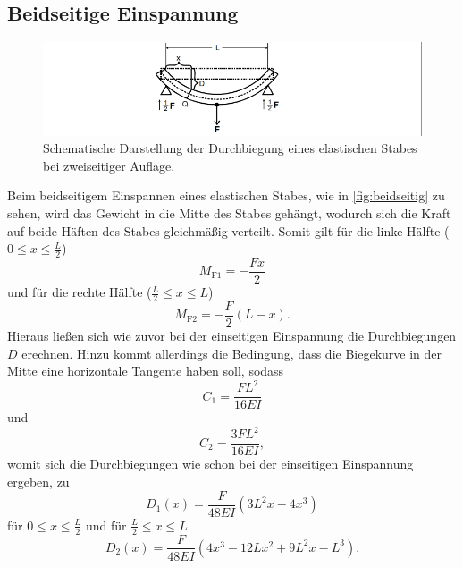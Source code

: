     \subsection{Beidseitige Einspannung}

        \begin{figure}
            \centering
            \includegraphics{content/beidseitig.png}
            \caption{Schematische Darstellung der Durchbiegung eines elastischen Stabes bei zweiseitiger Auflage. \cite{V103-s110}}
            \label{fig:beidseitig}
        \end{figure}

        Beim beidseitigem Einspannen eines elastischen Stabes, wie in \autoref{fig:beidseitig} zu sehen, wird das Gewicht in die Mitte des Stabes gehängt,
        wodurch sich die Kraft auf beide Häften des Stabes gleichmäßig verteilt.
        Somit gilt für die linke Hälfte ($0 \leq x \leq \frac{L}{2}$)
        \begin{equation}
        \label{eqn:mf1}
            M_\text{F1} = - \frac{F x } {2}
        \end{equation}
        und für die rechte Hälfte ($\frac{L}{2} \leq x \leq L $)    
        \begin{equation}
        \label{eqn:mf2}
            M_\text{F2} = - \frac {F}{2} (L - x).
        \end{equation}    
        Hieraus ließen sich wie zuvor bei der einseitigen Einspannung die Durchbiegungen $D$ erechnen.
        Hinzu kommt allerdings die Bedingung, dass die Biegekurve in der Mitte eine horizontale Tangente haben soll, sodass
        \begin{equation}
        \label{eqn:c1}
            C_1 = \frac{ F L^2} {16 E I}
        \end{equation}
        und 
        \begin{equation}
        \label{eqn:c2}
            C_2 = \frac{3 F L^2}{16 E I},
        \end{equation}
        womit sich die Durchbiegungen wie schon bei der einseitigen Einspannung ergeben, zu
        \begin{equation}
        \label{eqn:Durchbiegungbeidseitig1}
             D_1(x) =  \frac{F} {48 E I} (3L^2 x - 4 x^3)  
        \end{equation}
        für $0 \leq x \leq \frac{L}{2}$
        und für $\frac{L}{2} \leq x \leq L$
        \begin{equation}
        \label{eqn:Durchbiegungbeidseitig2}
           D_2(x) = \frac{F} {48 E I} (4 x^3 - 12 L x^2 + 9 L^2 x - L^3).
        \end{equation}   
